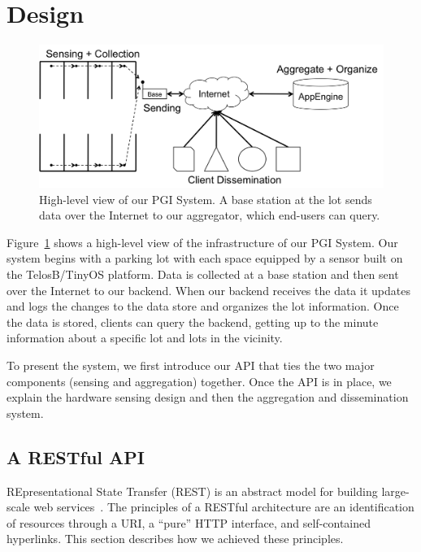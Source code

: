 \documentclass{acm_proc}
\begin{document}
\section{Design}\label{sec:design}

\begin{figure}
    \begin{center}
		\includegraphics[width=\columnwidth]{figures/high-level}
	\end{center}
	\caption{High-level view of our PGI System. A base station at the lot
	sends data over the Internet to our aggregator, which end-users can
	query.}
	\label{fig:high-level}
\end{figure}

Figure~\ref{fig:high-level} shows a high-level view of the infrastructure
of our PGI System.
Our system begins with a parking lot with each space equipped by a sensor
built on the TelosB/TinyOS platform.
Data is collected at a base station and then sent over the Internet to our
backend.
When our backend receives the data it updates and logs the changes to the
data store and organizes the lot information.
Once the data is stored, clients can query the backend, getting up to the
minute information about a specific lot and lots in the vicinity.

To present the system, we first introduce our API that ties the two major
components (sensing and aggregation) together.
Once the API is in place, we explain the hardware sensing design and then
the aggregation and dissemination system.

\subsection{A RESTful API}

REpresentational State Transfer (REST) is an abstract model for building
large-scale web services~\cite{pautasso:restful}.
The principles of a RESTful architecture are an identification of resources
through a URI, a ``pure'' HTTP interface, and self-contained hyperlinks.
This section describes how we achieved these principles.
\end{document}
